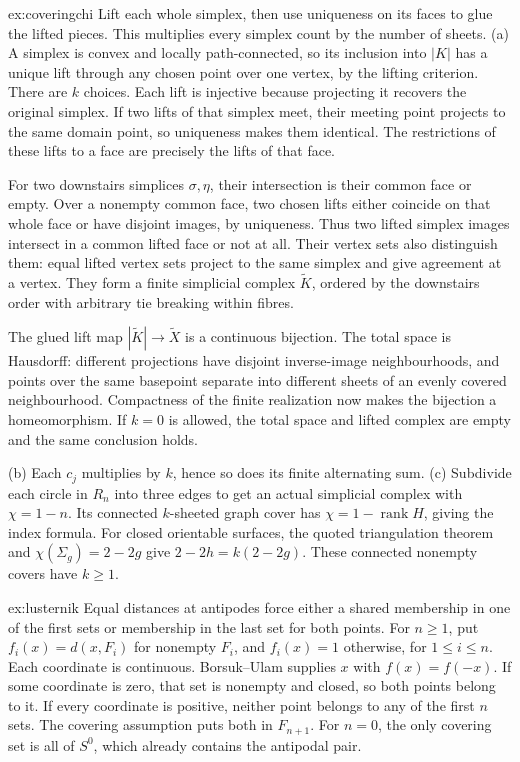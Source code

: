 \begin{solution}{ex:coveringchi}
\idea Lift each whole simplex, then use uniqueness on its faces to glue the lifted pieces. This multiplies every simplex count by the number of sheets.
\writeup (a) A simplex is convex and locally path-connected, so its inclusion into $|K|$ has a unique lift through any chosen point over one vertex, by the lifting criterion. There are $k$ choices. Each lift is injective because projecting it recovers the original simplex. If two lifts of that simplex meet, their meeting point projects to the same domain point, so uniqueness makes them identical. The restrictions of these lifts to a face are precisely the lifts of that face.

For two downstairs simplices $\sigma,\eta$, their intersection is their common face or empty. Over a nonempty common face, two chosen lifts either coincide on that whole face or have disjoint images, by uniqueness. Thus two lifted simplex images intersect in a common lifted face or not at all. Their vertex sets also distinguish them: equal lifted vertex sets project to the same simplex and give agreement at a vertex. They form a finite simplicial complex $\tilde K$, ordered by the downstairs order with arbitrary tie breaking within fibres.

The glued lift map $|\tilde K|\to\tilde X$ is a continuous bijection. The total space is Hausdorff: different projections have disjoint inverse-image neighbourhoods, and points over the same basepoint separate into different sheets of an evenly covered neighbourhood. Compactness of the finite realization now makes the bijection a homeomorphism. If $k=0$ is allowed, the total space and lifted complex are empty and the same conclusion holds.

(b) Each $c_j$ multiplies by $k$, hence so does its finite alternating sum. (c) Subdivide each circle in $R_n$ into three edges to get an actual simplicial complex with $\chi=1-n$. Its connected $k$-sheeted graph cover has $\chi=1-\operatorname{rank}H$, giving the index formula. For closed orientable surfaces, the quoted triangulation theorem and $\chi(\Sigma_g)=2-2g$ give $2-2h=k(2-2g)$. These connected nonempty covers have $k\ge1$.
\end{solution}

\begin{solution}{ex:lusternik}
\idea Equal distances at antipodes force either a shared membership in one of the first sets or membership in the last set for both points.
\writeup For $n\ge1$, put $f_i(x)=d(x,F_i)$ for nonempty $F_i$, and $f_i(x)=1$ otherwise, for $1\le i\le n$. Each coordinate is continuous. Borsuk--Ulam supplies $x$ with $f(x)=f(-x)$. If some coordinate is zero, that set is nonempty and closed, so both points belong to it. If every coordinate is positive, neither point belongs to any of the first $n$ sets. The covering assumption puts both in $F_{n+1}$. For $n=0$, the only covering set is all of $S^0$, which already contains the antipodal pair.
\end{solution}

